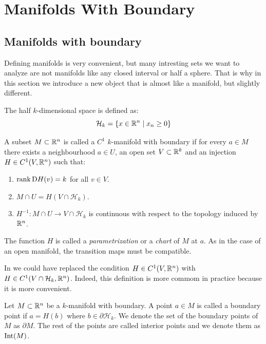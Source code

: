 \documentclass[11pt,a4paper]{article}
\begin{document}
\newpage

\section{Manifolds With Boundary}
\subsection{Manifolds with boundary}
Defining manifolds is very convenient, but many intresting sets
we want to analyze are not manifolds like any closed interval or
half a sphere. That is why in this section we introduce a new object
that is almost like a manifold, but slightly different.
\begin{definition}
  The half $k$-dimensional space is defined as:
  \[
    \mathcal{H}_k = \{x \in \mathbb{R}^n \mid x_n \geq 0\}
  \]
\end{definition}
\begin{definition}
  \label{def:manifold-with-boundary}
  A subset $M \subset \mathbb{R}^n$ is called a $C^1$ $k$-manifold 
  with boundary if for every $a \in M$ there exists
  a neighbourhood $a \in U$, an open set $V \subset \mathbb{R}^k$ and
  an injection $H \in C^1(V, \mathbb{R}^n)$ such that:
  \begin{enumerate}
    \item[(1)] $\operatorname{rank} \mathrm{D} H(v) = k$ for all $v \in V$.
    \item[(2)] $M \cap U = H(V \cap \mathcal{H}_k)$.
    \item[(3)] $H^{-1} \colon M \cap U \to V \cap \mathcal{H}_k$
    is continuous with respect to the topology induced by $\mathbb{R}^n$.
  \end{enumerate}
  The function $H$ is called a \textit{parametrization} or a \textit{chart}
  of $M$ at $a$.
  As in the case of an open manifold, the transition maps
  must be compatible.
\end{definition}

\begin{remark}
  In  we could have replaced the condition
  $H \in C^1(V, \mathbb{R}^n)$ with $H \in C^1(V \cap \mathcal H_k, \mathbb{R}^n)$.
  Indeed, this definition is more commom in practice because
  it is more convenient.
\end{remark}

\begin{definition}
  Let $M \subset \mathbb{R}^n$ be a $k$-manifold with boundary.
  A point $a \in M$ is called a boundary point
  if $a = H(b)$ where $b \in \partial \mathcal{H}_k$.
  We denote the set of the boundary points of $M$ as $\partial M$.
  The rest of the points are called interior points and we denote
  them as $\operatorname{Int}(M)$.
\end{definition}
\end{document}
